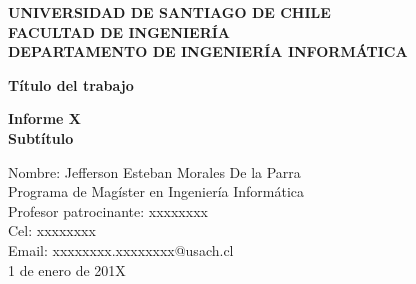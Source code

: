 \thispagestyle{empty}

\begin{center}
	{\bf\large UNIVERSIDAD DE SANTIAGO DE CHILE}\\
	{\bf\normalsize FACULTAD DE INGENIERÍA}\\
	{\bf\normalsize DEPARTAMENTO DE INGENIERÍA INFORMÁTICA}\\
\end{center}

\vspace*{8cm}

\begin{center}
    {\bf\normalsize Título del trabajo}
\end{center}

\vspace{1cm}

\begin{center}
    {\bf\normalsize Informe X}\\
    {\bf\normalsize Subtítulo}
\end{center}

\vspace{5cm}

\begin{flushright}
    Nombre: Jefferson Esteban Morales De la Parra\\
    Programa de Magíster en Ingeniería Informática\\
    Profesor patrocinante: xxxxxxxx\\
    Cel: xxxxxxxx\\
    Email: xxxxxxxx.xxxxxxxx@usach.cl\\
    1 de enero de 201X
\end{flushright}